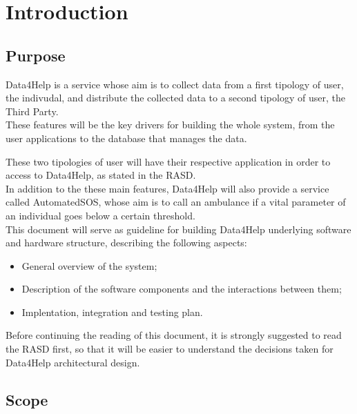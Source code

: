 
\chapter{Introduction}

\section{Purpose}
Data4Help is a service whose aim is to collect data from a first tipology of user, the indivudal, and distribute the collected data to a second tipology of user, the Third Party.\\
These features will be the key drivers for building the whole system, from the user applications to the database that manages the data.

These two tipologies of user will have their respective application in order to access to Data4Help, as stated in the RASD. 
\\
In addition to the these main features, Data4Help will also provide a service called AutomatedSOS, whose aim is to call an ambulance if a vital parameter of an individual goes below a certain threshold.
\\
This document will serve as guideline for building Data4Help underlying software and hardware structure, describing the following aspects:
\begin{itemize}
\item General overview of the system;
\item Description of the software components and the interactions between them;
\item Implentation, integration and testing plan.
\end{itemize}

Before continuing the reading of this document, it is strongly suggested to read the RASD first, so that it will be easier to understand the decisions taken for Data4Help architectural design.


\section{Scope}

